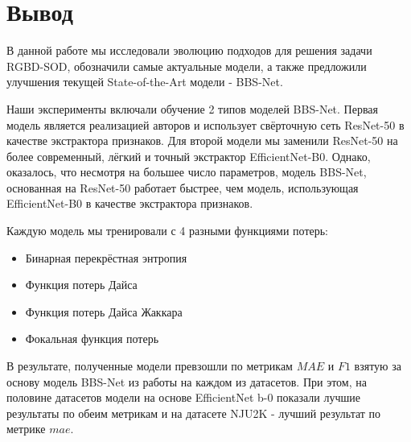\section{Вывод}


В данной работе мы исследовали эволюцию подходов для решения задачи RGBD-SOD, обозначили самые актуальные модели, 
а также предложили улучшения текущей State-of-the-Art модели - BBS-Net\cite{BBS}.

Наши эксперименты включали обучение 2 типов моделей BBS-Net. Первая модель является реализацией авторов \cite{BBS} и 
использует свёрточную сеть ResNet-50\cite{ResNet} в качестве экстрактора признаков. Для второй модели мы заменили ResNet-50 на более
современный, лёгкий и точный экстрактор EfficientNet-B0\cite{Efficientnet}. Однако, оказалось, что несмотря на большее число параметров, модель BBS-Net, 
основанная на ResNet-50 работает быстрее, чем модель, использующая EfficientNet-B0 в качестве экстрактора признаков. 

Каждую модель мы тренировали с 4 разными функциями потерь: 
\begin{itemize}
    \item Бинарная перекрёстная энтропия \cite{CE}
    \item Функция потерь Дайса\cite{Dice-Loss}
    \item Функция потерь Дайса Жаккара\cite{IoU-Loss}
    \item Фокальная функция потерь \cite{Focal-Loss}
\end{itemize}

В результате, полученные модели превзошли по метрикам $MAE$ и $F1$ взятую за основу модель BBS-Net из работы \cite{BBS} 
на каждом из датасетов. При этом, на половине датасетов модели на основе EfficientNet b-0 показали 
лучшие результаты по обеим метрикам и на датасете NJU2K - лучший результат по метрике $mae$.